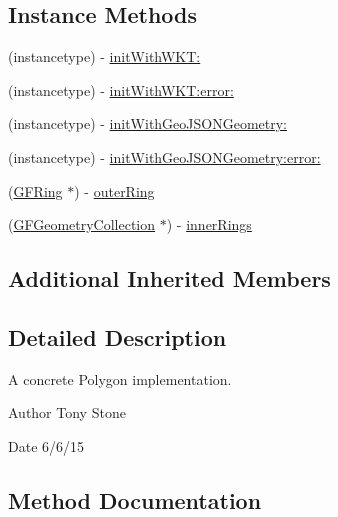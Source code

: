 \subsection*{Instance Methods}
\begin{DoxyCompactItemize}
\item 
(instancetype) -\/ \hyperlink{interface_g_f_polygon_a72e0e0e299103715f933177f57df2815}{init\+With\+W\+K\+T\+:}
\item 
(instancetype) -\/ \hyperlink{interface_g_f_polygon_aabc794c06956ee13f36acf6a61b2ec7c}{init\+With\+W\+K\+T\+:error\+:}
\item 
(instancetype) -\/ \hyperlink{interface_g_f_polygon_a91f132a23f38e16d5e8dea762f43ef84}{init\+With\+Geo\+J\+S\+O\+N\+Geometry\+:}
\item 
(instancetype) -\/ \hyperlink{interface_g_f_polygon_a46083a0507e17742cec90e68bc337717}{init\+With\+Geo\+J\+S\+O\+N\+Geometry\+:error\+:}
\item 
(\hyperlink{interface_g_f_ring}{G\+F\+Ring} $\ast$) -\/ \hyperlink{interface_g_f_polygon_af984fc68777e9069cd2418f6077454c1}{outer\+Ring}
\item 
(\hyperlink{interface_g_f_geometry_collection}{G\+F\+Geometry\+Collection} $\ast$) -\/ \hyperlink{interface_g_f_polygon_ae2a7ec1a59646496e5ed5e4a813909f9}{inner\+Rings}
\end{DoxyCompactItemize}
\subsection*{Additional Inherited Members}


\subsection{Detailed Description}
A concrete Polygon implementation. 

\begin{DoxyAuthor}{Author}
Tony Stone 
\end{DoxyAuthor}
\begin{DoxyDate}{Date}
6/6/15 
\end{DoxyDate}


\subsection{Method Documentation}
\hypertarget{interface_g_f_polygon_a72e0e0e299103715f933177f57df2815}{}
